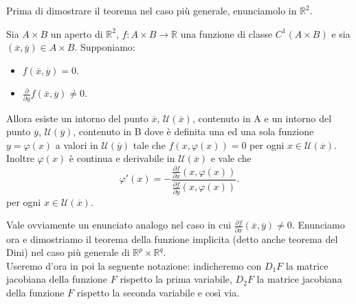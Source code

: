 Prima di dimostrare il teorema nel caso più generale, enunciamolo in $\mathbb{R}^{2}$.
\begin{teorema}
Sia $A \times B$ un aperto di $\mathbb{R}^{2}$, $f : A\times B \rightarrow \mathbb{R}$ una funzione di classe $C^{1}(A \times B)$ e sia $(\overline{x}, \overline{y}) \in A\times B$. Supponiamo:
\begin{itemize}
    \item $f(\overline{x},\overline{y})=0$.
    \item $\frac{\partial}{\partial y} f(\overline{x},\overline{y}) \neq 0$.
\end{itemize}
Allora esiste un intorno del punto $\overline{x}$, $\mathcal{U}(\overline{x})$, contenuto in A e un intorno del punto $\overline{y}$, $\mathcal{U}(\overline{y})$, contenuto in B dove è definita una ed una sola funzione $y = \varphi(x)$ a valori in $\mathcal{U}(\overline{y})$ tale che $f(x,\varphi(x))=0$ per ogni $x \in \mathcal{U}(\overline{x})$.\\
Inoltre $\varphi(x)$ è continua e derivabile in $\mathcal{U}(\overline{x})$ e vale che 
\begin{equation}
\varphi'(x)=-\frac{\frac{\partial f}{\partial x}(x,\varphi(x))}{\frac{\partial f}{\partial y}(x,\varphi(x))}.
\end{equation}
per ogni $x\in\mathcal{U}(\overline{x})$.
\end{teorema}
Vale ovviamente un enunciato analogo nel caso in cui $\frac{\partial f}{\partial x}(\overline{x},\overline{y}) \neq 0$.
Enunciamo ora e dimostriamo il teorema della funzione implicita (detto anche teorema del Dini) nel caso più generale di $\mathbb{R}^{p}\times\mathbb{R}^{q}$. \\
Useremo d'ora in poi la seguente notazione: indicheremo con $D_{1}F$ la matrice jacobiana della funzione $F$ rispetto la prima variabile, $D_{2}F$ la matrice jacobiana della funzione $F$ rispetto la seconda variabile e così via.


